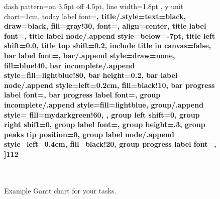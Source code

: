 \begin{itemize}
\begin{figure}[h]
\begin{center}
{\begin{ganttchart}
{					dash pattern=on 3.5pt off 4.5pt,
					line width=1.8pt
				},
				y unit chart=1cm,
				today label font=\footnotesize\bfseries,
				title/.style={text=black, draw=black, fill=gray!30, font=\Large\bfseries, align=center},
				title label font=\bfseries\footnotesize,
				title label node/.append style={below=-7pt},
				title left shift=0.0,
				title top shift=0.2,
				include title in canvas=false,
				bar label font=\mdseries\small\color{black!90},
				bar/.append style={draw=none, fill=blue!40},
				bar incomplete/.append style={fill=lightblue!80},
				bar height=0.2,
				bar label node/.append style={left=0.2cm, fill=black!10},
				bar progress label font=\bfseries\small,
				bar progress label font=\mdseries\footnotesize\color{black!80},
				group incomplete/.append style={fill=lightblue},
				group/.append style={
					fill=mydarkgreen!60, %
				},
				group left shift=0,
				group right shift=0,
				group label font=\mdseries\bfseries\small\color{black!90},
				group height=.3,
				group peaks tip position=0,
				group label node/.append style={left=0.4cm, fill=black!20},
				group progress label font=\mdseries\footnotesize\color{black!80},
				]{1}{12}
				 \\
				[grid]
				 \\
				[grid]
				 \\
				[grid]
			\end{ganttchart}
			}
		\end{center}
		\caption{Example Gantt chart for your tasks.}
	\end{figure}
	
\end{itemize}
